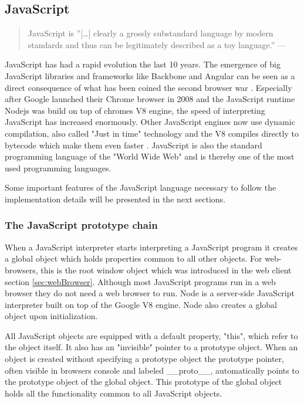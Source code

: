 \documentclass[english]{ifimaster}
\begin{document}
\subsection{JavaScript}
\label{sec:javaScript}
\begin{quotation}
\noindent JavaScript is ”[…] clearly a grossly substandard language by modern
standards and thus can be legitimately described as a toy language.” —
 \parencite{arno}
\end{quotation}

JavaScript has had a rapid evolution the last 10 years. The emergence of big JavaScript libraries and frameworks like Backbone and Angular can be seen as a direct consequence of what has been coined the second browser war \parencite{Yule2013}. Especially after Google launched their Chrome browser in 2008 and the JavaScript runtime Nodejs was build on top of chromes V8 engine, the speed of interpreting JavaScript has increased enormously. Other JavaScript engines now use dynamic compilation, also called "Just in time" technology and the V8 compiles directly to bytecode which make them even faster \parencite{anand}. JavaScript is also the standard programming language of the "World Wide Web" \parencite[p. 1]{flanagan} and is thereby one of the most used programming languages.

Some important features of the JavaScript language necessary to follow the implementation details will be presented in the next sections.

\subsubsection{The JavaScript prototype chain}
When a JavaScript interpreter starts interpreting a JavaScript program it creates a global object which holds properties common to all other objects. For web-browsers, this is the root window object which was introduced in the web client section \ref{sec:webBrowser}. Although most JavaScript programs run in a web browser they do not need a web browser to run. Node is a server-side JavaScript interpreter built on top of the Google V8 engine. Node also creates a global object upon initialization. 

All JavaScript objects are equipped with a default property, "this", which refer to the object itself. It also has an "invisible" pointer to a prototype object. When an object is created without specifying a prototype object the prototype pointer, often visible in browsers console and labeled \_\_proto\_\_, automatically points to the prototype object of the global object. This prototype of the global object holds all the functionality common to all JavaScript objects. 
\end{document}
